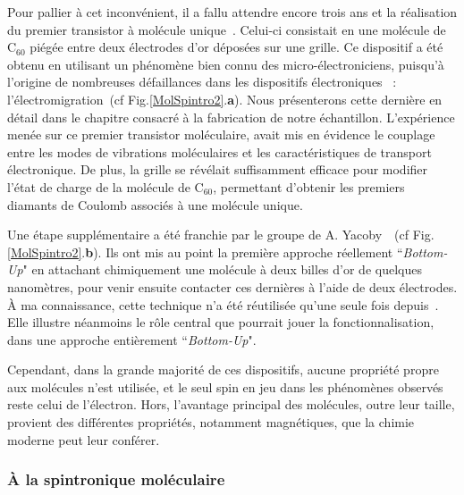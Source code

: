 Pour pallier à cet inconvénient, il a fallu attendre encore trois ans et la réalisation du premier transistor à molécule unique~\cite{Park2000}. Celui-ci consistait en une molécule de C$_{60}$ piégée entre deux électrodes d'or déposées sur une grille. Ce dispositif a été obtenu en utilisant un phénomène bien connu des micro-électroniciens, puisqu'à l'origine de nombreuses défaillances dans les dispositifs électroniques~\cite{Ho1989,Tu1992} : l'électromigration~(cf Fig.\ref{MolSpintro2}.\textbf{a}). Nous présenterons cette dernière en détail dans le chapitre consacré à la fabrication de notre échantillon. 
L'expérience menée sur ce premier transistor moléculaire, avait mis en évidence le couplage entre les modes de vibrations moléculaires et les caractéristiques de transport électronique. De plus, la grille se révélait suffisamment efficace pour modifier l'état de charge de la molécule de C$_{60}$, permettant d'obtenir les premiers diamants de Coulomb associés à une molécule unique.

Une étape supplémentaire a été franchie par le groupe de A. Yacoby~\cite{Dadosh2005}~(cf Fig.\ref{MolSpintro2}.\textbf{b}). Ils ont mis au point la première approche réellement ``\textit{Bottom-Up}" en attachant chimiquement une molécule à deux billes d'or de quelques nanomètres, pour venir ensuite contacter ces dernières à l'aide de deux électrodes. \`A ma connaissance, cette technique n'a été réutilisée qu'une seule fois depuis~\cite{Jain2009}. Elle illustre néanmoins le rôle central que pourrait jouer la fonctionnalisation, dans une approche entièrement ``\textit{Bottom-Up}".

Cependant, dans la grande majorité de ces dispositifs, aucune propriété propre aux molécules n'est utilisée, et le seul spin en jeu dans les phénomènes observés reste celui de l'électron. Hors, l'avantage principal des molécules, outre leur taille, provient des différentes propriétés, notamment magnétiques, que la chimie moderne peut leur conférer.

\subsubsection*{\`A la spintronique moléculaire}

